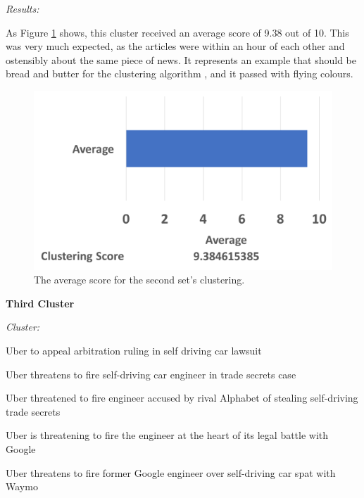 \documentclass[12pt]{article}
\begin{document}
\emph{Results:}

As Figure \ref{cluster2} shows, this cluster received an average score of 9.38 out of 10. This was very much expected, as the articles were within an hour of each other and ostensibly about the same piece of news. It represents an example that should be bread and butter for the clustering algorithm , and it passed with flying colours. \\

\begin{figure}[ht!]
  \centering
    \includegraphics[scale=0.6]{cluster2score.png}
   \caption[The average score for a cluster]{The average score for the second set's clustering.} 
   \label{cluster2}
\end{figure} 

\textbf{Third Cluster}

\begin{mdframed}

\emph{Cluster:}

Uber to appeal arbitration ruling in self driving car lawsuit \cite{uber1}

Uber threatens to fire self-driving car engineer in trade secrets case \cite{uber2}

Uber threatened to fire engineer accused by rival Alphabet of stealing self-driving trade secrets \cite{uber3}

Uber is threatening to fire the engineer at the heart of its legal battle with Google \cite{uber4}

Uber threatens to fire former Google engineer over self-driving car spat with Waymo \cite{uber5} \\

\end{mdframed}
\end{document}
